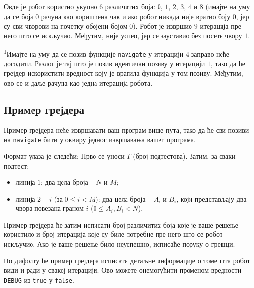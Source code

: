 \documentclass[12pt]{article}
\begin{document}
Овде је робот користио укупно $6$ различитих боја: $0$, $1$, $2$, $3$, $4$ и $8$ (имајте на уму да се боја $0$ рачуна као коришћена чак и ако робот никада није вратио боју $0$, јер су сви чворови на почетку обојени бојом $0$). Робот је извршио $9$ итерација пре него што се искључио. Међутим, није успео, јер се зауставио без посете чвору $1$.

\textsuperscript{1}Имајте на уму да се позив функције \texttt{navigate} у итерацији $4$ заправо неће догодити. Разлог је тај што је позив идентичан позиву у итерацији $1$, тако да ће грејдер искористити вредност коју је вратила функција у том позиву. Међутим, ово се и даље рачуна као једна итерација робота.

\subsection{Пример грејдера}

Пример грејдера неће извршавати ваш програм више пута, тако да ће сви позиви на \texttt{navigate} бити у оквиру једног извршавања вашег програма.

Формат улаза је следећи: Прво се уноси $T$ (број подтестова). Затим, за сваки подтест:
\begin{itemize}
\item линија $1$: два цела броја -- $N$ и $M$;
\item линија $2+i$ (за $0 \leq i < M$): два цела броја -- $A_i$ и $B_i$, који представљају два чвора повезана граном $i$ ($0 \leq A_i, B_i < N$).
\end{itemize}

Пример грејдера ће затим исписати број различитих боја које је ваше решење користило и број итерација које су биле потребне пре него што се робот искључио. Ако је ваше решење било неуспешно, исписаће поруку о грешци.

По дифолту ће пример грејдера исписати детаљне информације о томе шта робот види и ради у свакој итерацији. Ово можете онемогућити променом вредности \texttt{DEBUG} из \texttt{true} у \texttt{false}.
\end{document}
